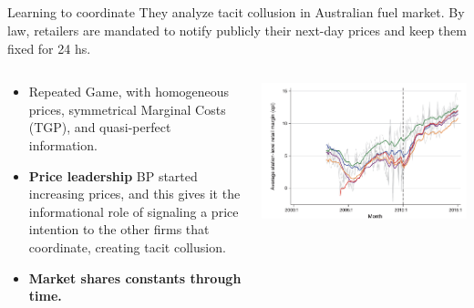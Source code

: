 \documentclass[10pt]{beamer}
\begin{document}
\subsection{}


\begin{frame}[fragile]{Learning to coordinate}
They analyze tacit collusion in Australian fuel market. By law, retailers are mandated to notify publicly their next-day prices and keep them fixed for 24 hs.

    \begin{columns}
        \begin{column}{0.55\textwidth}
            \begin{itemize}
                \item Repeated Game, with homogeneous prices, symmetrical Marginal Costs (TGP), and quasi-perfect information.
                \item \textbf{Price leadership} BP started increasing prices, and this gives it the informational role of signaling a price intention to the other firms that coordinate, creating tacit collusion.
                \item \textbf{Market shares constants through time.}
            \end{itemize}
        \end{column}
    
        \begin{column}{0.55\textwidth}
            \includegraphics[width=\linewidth]{slides_pricing_collusion/imgs/avg_margins_by_firm.png}
            
        \end{column}
    \end{columns}

\end{frame}
\end{document}
